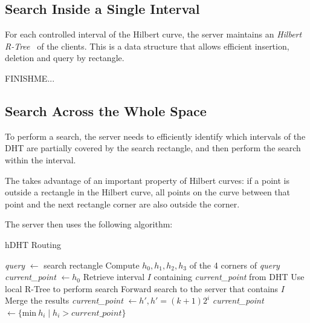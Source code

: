 \subsection{Search Inside a Single Interval}
For each controlled interval of the Hilbert curve, the server maintains an \textit{Hilbert R-Tree}~\cite{kamel1993hilbert} of the clients.
This is a data structure that allows efficient insertion, deletion and query by rectangle.

FINISHME...

\subsection{Search Across the Whole Space}
To perform a search, the server needs to efficiently identify which intervals of the DHT are partially covered by the search rectangle, and then perform the search within the interval.

The takes advantage of an important property of Hilbert curves: if a point is outside a rectangle in the Hilbert curve, all points on the curve between that point and the next rectangle corner are also outside the corner.

The server then uses the following algorithm:
\begin{algorithm}[H]
  \caption{hDHT Routing}
  \begin{algorithmic}[1]
  	\State \textit{query} $\gets$ search rectangle
  	\State Compute $h_0, h_1, h_2, h_3$ of the 4 corners of \textit{query} 
    \State \textit{current\_point} $\gets h_0$
     		\State Retrieve interval $I$ containing \textit{current\_point} from DHT
     			\State Use local R-Tree to perform search
     		\Else
     			\State Forward search to the server that contains $I$
     			\State Merge the results
     		\EndIf
     		\State \textit{current\_point} $\gets h', h' = (k+1) 2^i$ 
     	\Else
     		\State \textit{current\_point} $\gets \{\text{min}\ h_i \mid h_i > \textit{current\_point} \}$ 
     	\EndIf
    \EndWhile
  \end{algorithmic}
\end{algorithm}

